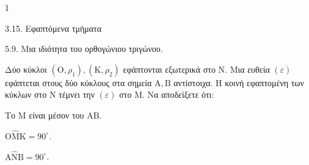 \begin{ylh}{1}
    \item 3.15. Εφαπτόμενα τμήματα
    \item 5.9. Μια ιδιότητα του ορθογώνιου τριγώνου.
\end{ylh}
Δύο κύκλοι $(\mathrm{O}, \rho_1), (\mathrm{K}, \rho_2)$ εφάπτονται εξωτερικά στο $\mathrm{N}$. Μια ευθεία $(\varepsilon)$ εφάπτεται στους δύο κύκλους στα σημεία $\mathrm{A}, \mathrm{B}$ αντίστοιχα. Η κοινή εφαπτομένη των κύκλων στο $\mathrm{N}$ τέμνει την $(\varepsilon)$ στο $\mathrm{M}$.
Να αποδείξετε ότι:
\begin{alist}
    \item Το $\mathrm{M}$ είναι μέσον του $\mathrm{A}\mathrm{B}$. 
    \item $\mathrm{O}\hat{\mathrm{M}}\mathrm{K} = 90^\circ$. 
    \item $\mathrm{A}\hat{\mathrm{N}}\mathrm{B} = 90^\circ$. 
\end{alist}
